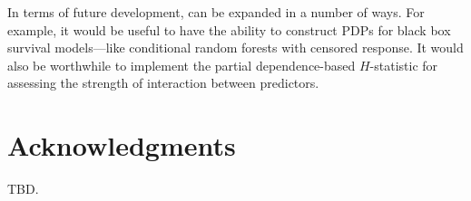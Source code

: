In terms of future development,  can be expanded in a number of ways. For example, it would be useful to have the ability to construct PDPs for black box survival models---like conditional random forests with censored response. It would also be worthwhile to implement the partial dependence-based $H$-statistic \citep{friedman-2008-predictive} for assessing the strength of interaction between predictors.


\section{Acknowledgments}

TBD.





\address{Brandon M. Greenwell\\
  Infoscitex Corporation\\
  4027 Colonel Glenn Highway\\
  Suite 210\\
  Dayton, OH 45431-1672\\
  United States of America\\}
